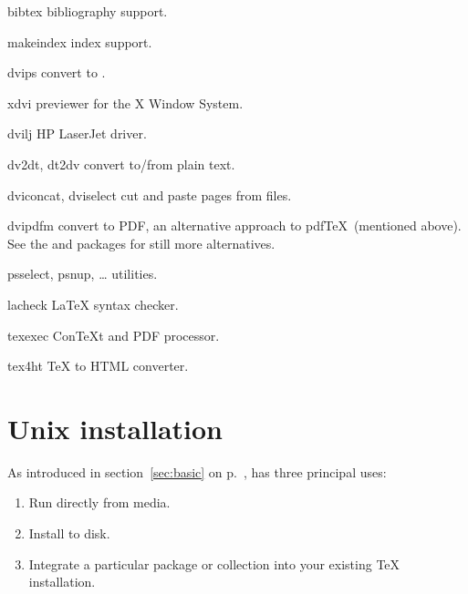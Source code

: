 \documentclass{article}
\begin{document}
\begin{cmddescription}

\item [bibtex] bibliography support.

\item [makeindex] index support.

\item [dvips] convert \dvi{} to \PS{}.

\item [xdvi] \dvi{} previewer for the X Window System.

\item [dvilj] HP LaserJet driver.

\item [dv2dt, dt2dv] convert \dvi{} to/from plain text.

\item [dviconcat, dviselect] cut and paste pages
from \dvi{} files.

\item [dvipdfm] convert \dvi{} to PDF, an alternative approach
to pdf\TeX\ (mentioned above).  See the  and
 packages for still more alternatives.

\item [psselect, psnup, \ldots] \PS{}
utilities.

\item [lacheck] \LaTeX{} syntax checker.

\item [texexec] Con\TeX{}t and PDF processor.

\item [tex4ht] \TeX{} to HTML converter.  

\end{cmddescription}


\section{Unix installation}
\label{sec:unix-install}

As introduced in section~\ref{sec:basic} on p.~\pageref{sec:basic},
\TeXLive{} has three principal uses:

\begin{enumerate}
\item Run directly from media.
\item Install to disk.
\item Integrate a particular package or collection into your existing
\TeX{} installation.
\end{enumerate}
\end{document}
